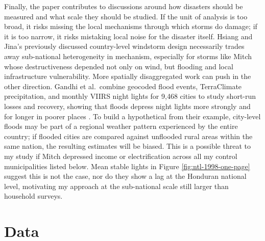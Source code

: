 \documentclass[12pt]{article}
\begin{document}

Finally, the paper contributes to discussions around how disasters should be measured and what scale they should be studied. If the unit of analysis is too broad, it risks missing the local mechanisms through which storms do damage; if it is too narrow, it risks mistaking local noise for the disaster itself. Hsiang and Jina's previously discussed country-level windstorm design necessarily trades away sub-national heterogeneity in mechanism, especially for storms like Mitch whose destructiveness depended not only on wind, but flooding and local infrastructure vulnerability. More spatially disaggregated work can push in the other direction. Gandhi et al.\ combine geocoded flood events, TerraClimate precipitation, and monthly VIIRS night lights for 9,468 cities to study short-run losses and recovery, showing that floods depress night lights more strongly and for longer in poorer places \parencite{gandhi2022adapting}. To build a hypothetical from their example, city-level floods may be part of a regional weather pattern experienced by the entire country; if flooded cities are compared against unflooded rural areas within the same nation, the resulting estimates will be biased. This is a possible threat to my study if Mitch depressed income or electrification across all my control municipalities listed below. Mean stable lights in Figure \ref{fig:ntl-1998-one-page} suggest this is not the case, nor do they show a lag at the Honduran national level, motivating my approach at the sub-national scale still larger than household surveys.

\section{Data}
\end{document}
